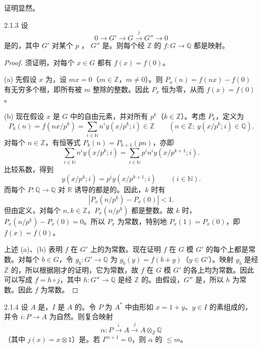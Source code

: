 证明显然。
\begin{SGAresult}{}{2.1.3}
设
\[0\longrightarrow G'\longrightarrow G\xrightarrow{j}G''\longrightarrow0\]
是的，其中 $G'$ 对某个 $p$ ，
$G''$ 是。则每个经 $\mathbb Z$ 的 $f:G\longrightarrow\mathbb Q$ 都是映射。
\end{SGAresult}
\begin{proof}
须证明，对每个 $x\in G$ 都有 $f(x)=f(0)$。

(a) 先假设 $x$ 为，设 $mx=0$（$m\in\mathbb Z$，$m\ne0$）。则 $P_x(n)=f(nx)-f(0)$ 有无穷多个根，即所有被 $m$ 整除的整数。因此 $P_x$ 恒为零，从而 $f(x)=f(0)$。

(b) 现在假设 $x$ 是 $G$ 中的自由元素，并对所有 $p^k$（$k\in\mathbb Z$）。考虑 $P_k$，定义为
\[P_k(n)=f(nx/p^k)=\sum_{i\in\mathbb N}n^iy(x/p^k;i)\in\mathbb Z\qquad(n\in\mathbb Z;\ y(x/p^k;i)\in\mathbb Q).\]
对每个 $n\in\mathbb Z$，有恒等式 $P_k(n)=P_{k+1}(pn)$，亦即
\[\sum_{i\in\mathbb N}n^iy(x/p^k;i)=\sum_{i\in\mathbb N}p^in^iy(x/p^{k+1};i).\]
比较系数，得到
\[y(x/p^k;i)=p^iy(x/p^{k+1};i)\qquad(i\in\mathbb N).\]
而每个 $P:\mathbb Q\longrightarrow\mathbb Q$ 对 $\mathbb R$ 诱导的都是的。因此，$k$ 时有
\[|P_x(n/p^k)-P_x(0)|<1.\]
但由定义，对每个 $n,k\in\mathbb Z$，$P_x(n/p^k)$ 都是整数。故 $k$ 时，$P_x(n/p^k)-P_x(0)=0$。所以 $P_x$ 为常数，特别地 $P_x(1)=P_x(0)$，即 $f(x)=f(0)$。

上述 (a)、(b) 表明 $f$ 在 $G'$ 上的为常数。现在证明 $f$ 在 $G$ 模 $G'$ 的每个上都是常数。对每个 $b\in G$，令 $g_b:G'\longrightarrow\mathbb Q$ 为 $g_b(y)=f(b+y)$（$y\in G'$）。映射 $g_b$ 是经 $\mathbb Z$ 的，所以根据刚才的证明，它为常数，故 $f$ 在 $G$ 模 $G'$ 的各上均为常数。因此可以写成 $f=h\circ j$，其中 $h:G''\longrightarrow\mathbb Q$ 是经 $\mathbb Z$ 的。由假设，$G''$ 是，所以 $h$ 为常数。因此 $f$ 为常数。
\end{proof}
\begin{SGAresult}{}{2.1.4}
设 $A$ 是，$I$ 是 $A$ 的。令 $P$ 为 $A^*$ 中由形如 $x=1+y$、$y\in I$ 的素组成的，并令 $i:P\longrightarrow A$ 为自然。则复合映射
\[\alpha:P\xrightarrow{i}A\xrightarrow{j}A\otimes_{\mathbb Z}\mathbb Q\]
（其中 $j(x)=x\otimes1$）是。若 $I^{m+1}=0$，则 $\alpha$ 的 $\leq m$。
\end{SGAresult}
